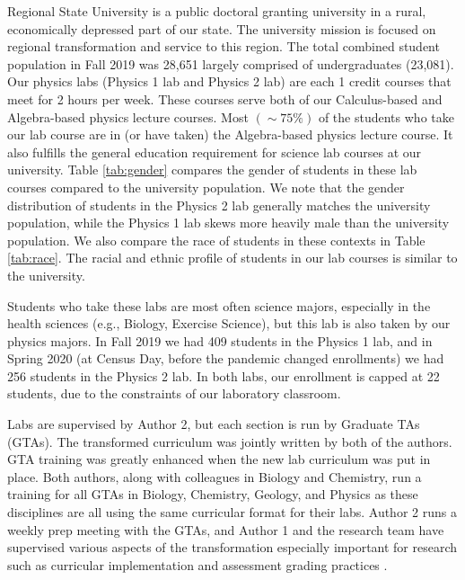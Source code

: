 \documentclass[aip, numerical, preprint]{revtex4-2}
\begin{document}
Regional State University is a public doctoral granting university in a rural, economically
depressed part of our state.  The university mission is focused on regional transformation and
service to this region.  The total combined student population in Fall 2019 was 28,651 largely
comprised of undergraduates (23,081).  Our physics labs (Physics 1 lab and Physics 2 lab) are
each 1 credit courses that meet for 2 hours per week. These courses serve both of our
Calculus-based and Algebra-based physics lecture courses.  Most $(\sim 75\%)$ of the students
who take our lab course are in (or have taken) the Algebra-based physics lecture course. It
also fulfills the general education requirement for science lab courses at our university.
Table \ref{tab:gender} compares the gender of students in these lab courses compared to the
university population.  We note that the gender distribution of students in the Physics 2 lab
generally matches the university population, while the Physics 1 lab skews more heavily male
than the university population.  We also compare the race of students in these contexts in
Table \ref{tab:race}.  The racial and ethnic profile of students in our lab courses is similar
to the university.

Students who take these labs are most often science majors, especially in the health sciences
(e.g., Biology, Exercise Science), but this lab is also taken by our physics majors.  In Fall
2019 we had 409 students in the Physics 1 lab, and in Spring 2020 (at Census Day, before the
pandemic changed enrollments) we had 256 students in the Physics 2 lab.  In both labs, our
enrollment is capped at 22 students, due to the constraints of our laboratory classroom.

Labs are supervised by Author 2, but each section is run by Graduate TAs (GTAs). The
transformed curriculum was jointly written by both of the authors.  GTA training was greatly
enhanced when the new lab curriculum was put in place.  Both authors, along with colleagues in
Biology and Chemistry, run a training for all GTAs in Biology, Chemistry, Geology, and Physics
as these disciplines are all using the same curricular format for their labs.  Author 2 runs a
weekly prep meeting with the GTAs, and Author 1 and the research team have supervised various
aspects of the transformation especially important for research such as curricular
implementation \citep{SmithJoyner2020} and assessment grading practices \citep{Wolf2019}.
\end{document}
